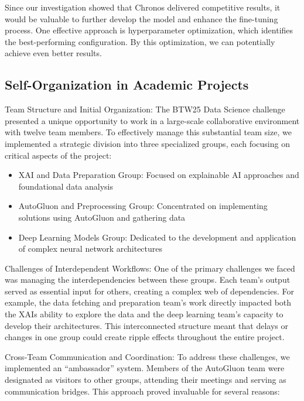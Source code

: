 \documentclass[a4paper]{article}
\providecommand{\tightlist}{%
      \setlength{\itemsep}{0pt}\setlength{\parskip}{0pt}}
\begin{document}
Since our investigation showed that Chronos delivered competitive
results, it would be valuable to further develop the model and enhance
the fine-tuning process. One effective approach is hyperparameter
optimization, which identifies the best-performing configuration. By
this optimization, we can potentially achieve even better results.

    \subsection{Self-Organization in Academic
Projects}\label{self-organization-in-academic-projects}

Team Structure and Initial Organization: The BTW25 Data Science
challenge presented a unique opportunity to work in a large-scale
collaborative environment with twelve team members. To effectively
manage this substantial team size, we implemented a strategic division
into three specialized groups, each focusing on critical aspects of the
project:

\begin{itemize}
\tightlist
\item
  XAI and Data Preparation Group: Focused on explainable AI approaches
  and foundational data analysis
\item
  AutoGluon and Preprocessing Group: Concentrated on implementing
  solutions using AutoGluon and gathering data
\item
  Deep Learning Models Group: Dedicated to the development and
  application of complex neural network architectures
\end{itemize}

Challenges of Interdependent Workflows: One of the primary challenges we
faced was managing the interdependencies between these groups. Each
team's output served as essential input for others, creating a complex
web of dependencies. For example, the data fetching and preparation
team's work directly impacted both the XAIs ability to explore the data
and the deep learning team's capacity to develop their architectures.
This interconnected structure meant that delays or changes in one group
could create ripple effects throughout the entire project.

Cross-Team Communication and Coordination: To address these challenges,
we implemented an ``ambassador'' system. Members of the AutoGluon team
were designated as visitors to other groups, attending their meetings
and serving as communication bridges. This approach proved invaluable
for several reasons:
\end{document}
